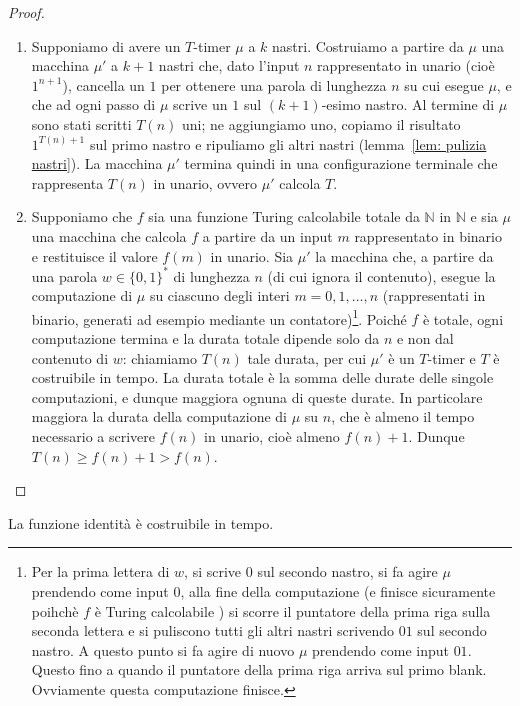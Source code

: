 \begin{proof}
\ 
\begin{enumerate}
\item Supponiamo di avere un $T$-timer $\mu$ a $k$ nastri. Costruiamo a partire da $\mu$ una macchina $\mu'$ a $k+1$ nastri che, dato l'input $n$ rappresentato in unario (cioè $1^{n+1}$), cancella un $1$ per ottenere una parola di lunghezza $n$ su cui esegue $\mu$, e che ad ogni passo di $\mu$ scrive un $1$ sul $(k+1)$-esimo nastro. Al termine di $\mu$ sono stati scritti $T(n)$ uni; ne aggiungiamo uno, copiamo il risultato $1^{T(n)+1}$ sul primo nastro e ripuliamo gli altri nastri (lemma~\ref{lem: pulizia nastri}). La macchina $\mu'$ termina quindi in una configurazione terminale che rappresenta $T(n)$ in unario, ovvero $\mu'$ calcola $T$.
\item Supponiamo che $f$ sia una 
funzione Turing calcolabile totale da $\mathbb N$ in $\mathbb N$ e sia $\mu$ una macchina che calcola $f$ a partire 
da un input $m$ rappresentato in binario e restituisce il valore $f(m)$ in unario. Sia $\mu'$ la macchina che, 
a partire da una parola $w\in\{0,1\}^*$ di lunghezza $n$ (di cui ignora il contenuto), 
esegue la computazione di $\mu$ su ciascuno degli interi $m=0,1,\dots,n$ 
(rappresentati in binario, generati ad esempio mediante un contatore)\footnote{Per la prima lettera di $w$, si scrive $0$ 
sul secondo nastro, si fa agire $\mu$ prendendo come input $0$, alla fine della computazione (e finisce sicuramente poihchè $f$ è Turing calcolabile
) si scorre il puntatore della prima riga sulla seconda lettera e si puliscono tutti gli altri nastri scrivendo $01$ sul secondo nastro. A questo punto si fa 
agire di nuovo $\mu$ prendendo come input $01$. Questo fino a quando il puntatore della prima riga arriva sul primo blank. Ovviamente questa computazione finisce.}. 
Poiché $f$ è totale, ogni computazione termina e la durata totale dipende solo da $n$ e non dal 
contenuto di $w$: chiamiamo $T(n)$ tale durata, per cui $\mu'$ è un $T$-timer e $T$ è costruibile in tempo. 
La durata totale è la somma delle durate delle singole computazioni, e dunque maggiora ognuna di queste durate. 
In particolare maggiora la durata della computazione di $\mu$ su $n$, che è almeno il tempo necessario a scrivere $f(n)$ 
in unario, cioè almeno $f(n)+1$. Dunque $T(n)\ge f(n)+1>f(n)$.
\end{enumerate}
\end{proof}

\begin{lemm}
La funzione identità è costruibile in tempo.
\end{lemm}

